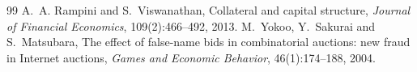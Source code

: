 \begin{thebibliography}{99}
A.~A. Rampini and S.~Viswanathan,
\newblock Collateral and capital structure,
\newblock \emph{Journal of Financial Economics}, 109(2):466--492, 2013.
M.~Yokoo, Y.~Sakurai and S.~Matsubara,
\newblock The effect of false-name bids in combinatorial auctions: new fraud in Internet auctions,
\newblock \emph{Games and Economic Behavior}, 46(1):174--188, 2004.
\end{thebibliography}
